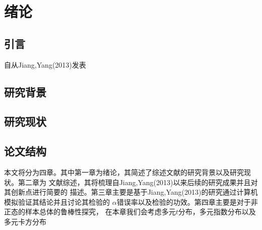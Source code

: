 \chapter{绪论}

\section{引言}
自从Jiang,Yang(2013)\cite{}发表
\section{研究背景}

\section{研究现状}

\section{论文结构}
本文将分为四章。其中第一章为绪论，其简述了综述文献的研究背景以及研究现状。第二章为
文献综述，其将梳理自Jiang,Yang(2013)\cite{}以来后续的研究成果并且对其创新点进行简要的
描述。第三章主要是基于Jiang,Yang(2013)\cite{}的研究通过计算机模拟验证其结论并且讨论其检验的
$\alpha$错误率以及检验的功效。第四章主要是对于非正态的样本总体的鲁棒性探究，
在本章我们会考虑多元$t$分布，多元指数分布以及
多元卡方分布